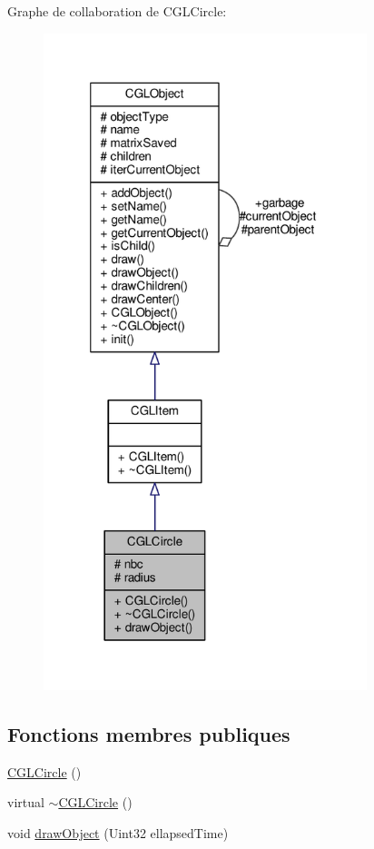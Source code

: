 Graphe de collaboration de C\-G\-L\-Circle\-:\nopagebreak
\begin{figure}[H]
\begin{center}
\leavevmode
\includegraphics[width=267pt]{d6/dd4/class_c_g_l_circle__coll__graph}
\end{center}
\end{figure}
\subsection*{Fonctions membres publiques}
\begin{DoxyCompactItemize}
\item 
\hyperlink{class_c_g_l_circle_a1fe3551de86200bfe24974c3c525c40a}{C\-G\-L\-Circle} ()
\item 
virtual \hyperlink{class_c_g_l_circle_ab84374a651938aef9342e2eba537f38b}{$\sim$\-C\-G\-L\-Circle} ()
\item 
void \hyperlink{class_c_g_l_circle_a222f67da86a92a075011ec607154b1f8}{draw\-Object} (Uint32 ellapsed\-Time)
\end{DoxyCompactItemize}
